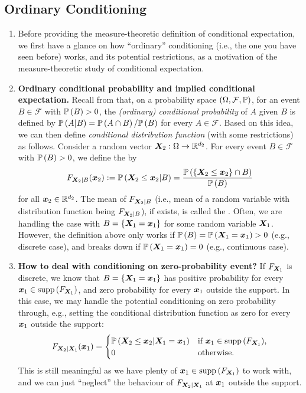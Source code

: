 \subsection{Ordinary Conditioning}
\begin{enumerate}
\item Before providing the measure-theoretic definition of conditional
expectation, we first have a glance on how ``ordinary'' conditioning (i.e., the
one you have seen before) works, and its potential restrictions, as a
motivation of the measure-theoretic study of conditional expectation.
\item \textbf{Ordinary conditional probability and implied conditional
expectation.} Recall from  that, on a
probability space \((\Omega,\mathcal{F},\mathbb{P})\), for an event
\(B\in\mathcal{F}\) with \(\mathbb{P}\left(B\right)>0\), the \emph{(ordinary) conditional
probability} of \(A\) given \(B\) is defined by \(\mathbb{P}\left(A|B\right)=\mathbb{P}\left(A\cap
B\right)/\mathbb{P}\left(B\right)\) for every \(A\in\mathcal{F}\). Based on this idea, we can then
define \emph{conditional distribution function} (with some restrictions) as
follows. Consider a random vector \(\bm{X}_2:\Omega\to\mathbb{R}^{d_{2}}\). For every
event \(B\in\mathcal{F}\) with \(\mathbb{P}\left(B\right)>0\), we define the  by
\[
F_{\bm{X}_2|B}(\bm{x}_2):=\mathbb{P}\left(\bm{X}_2\le\bm{x}_2|B\right)
=\frac{\mathbb{P}\left(\{\bm{X}_2\le\bm{x}_2\}\cap B\right)}{\mathbb{P}\left(B\right)}
\]
for all \(\bm{x}_2\in\mathbb{R}^{d_2}\). The mean of \(F_{\bm{X}_2|B}\) (i.e., mean
of a random variable with distribution function being \(F_{\bm{X}_2|B}\)), if
exists, is called the .  Often, we are handling the case with
\(B=\{\bm{X}_1=\bm{x}_1\}\) for some random variable \(\bm{X}_1\).
However, the definition above only works if
\(\mathbb{P}\left(B\right)=\mathbb{P}\left(\bm{X}_1=\bm{x}_1\right)>0\) (e.g., discrete case), and breaks
down if \(\mathbb{P}\left(\bm{X}_1=\bm{x}_1\right)=0\) (e.g., continuous case).
\item \textbf{How to deal with conditioning on zero-probability
event?}
If \(F_{\bm{X}_1}\) is discrete, we know that
\(B=\{\bm{X}_1=\bm{x}_1\}\) has positive probability for every
\(\bm{x}_1\in\operatorname{supp}\left(F_{\bm{X}_1}\right)\), and zero probability for every
\(\bm{x}_1\) outside the support. In this case, we may handle the potential
conditioning on zero probability through, e.g., setting the conditional
distribution function as zero for every \(\bm{x}_1\) outside the support:
\[
F_{\bm{X}_2|\bm{X}_1}(\bm{x}_1)=
\begin{cases}
\mathbb{P}\left(\bm{X}_2\le\bm{x}_2|\bm{X}_1=\bm{x}_1\right)&\text{if \(\bm{x}_1\in\operatorname{supp}\left(F_{\bm{X}_1}\right)\),} \\
0&\text{otherwise.}
\end{cases}
\]
This is still meaningful as we have plenty of
\(\bm{x}_1\in\operatorname{supp}\left(F_{\bm{X}_1}\right)\) to work with, and we can just
``neglect'' the behaviour of \(F_{\bm{X}_2|\bm{X}_1}\) at \(\bm{x}_1\)
outside the support.


\end{enumerate}
